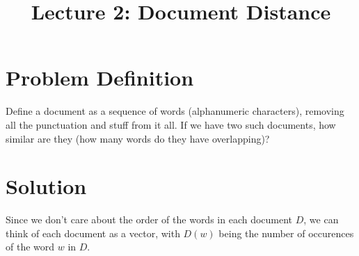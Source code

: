 \documentclass{article}
\title{Lecture 2: Document Distance}
\begin{document}
    \section{Problem Definition}
        Define a document as a sequence of words (alphanumeric characters), removing all the punctuation and stuff from it all. If we have two such documents, how similar are they (how many words do they have overlapping)?
    \section{Solution}
        Since we don't care about the order of the words in each document $D$, we can think of each document as a vector, with $D(w)$ being the number of occurences of the word $w$ in $D$.
\end{document}
